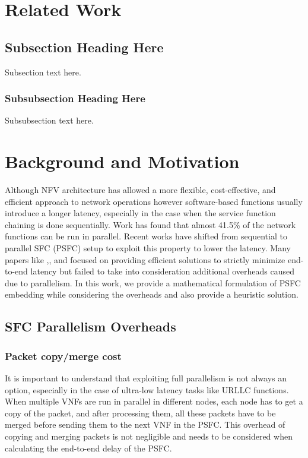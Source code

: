 \documentclass[journal]{IEEEtran}
\begin{document}
\section{Related Work}\subsection{Subsection Heading Here}
Subsection text here.


\subsubsection{Subsubsection Heading Here}
Subsubsection text here.

\section{Background and Motivation}
Although NFV architecture has allowed a more flexible, cost-effective, and efficient approach to network operations however software-based functions usually introduce a longer latency, especially in the case when the service function chaining is done sequentially. Work \cite{NFP} has found that almost 41.5\% of the network functions can be run in parallel. Recent works have shifted from sequential to parallel SFC (PSFC) setup to exploit this property to lower the latency. Many papers like \cite{TON},\cite{SFT-box},\cite{TWC} and \cite{TON-extension} focused on providing efficient solutions to strictly minimize end-to-end latency but failed to take into consideration additional overheads caused due to parallelism. In this work, we provide a mathematical formulation of PSFC embedding while considering the overheads and also provide a heuristic solution.
\subsection{SFC Parallelism Overheads}


\subsubsection{Packet copy/merge cost}
It is important to understand that exploiting full parallelism is not always an option, especially in the case of ultra-low latency tasks like URLLC functions. When multiple VNFs are run in parallel in different nodes, each node has to get a copy of the packet, and after processing them, all these packets have to be merged before sending them to the next VNF in the PSFC. This overhead of copying and merging packets is not negligible and needs to be considered when calculating the end-to-end delay of the PSFC. 
\end{document}
